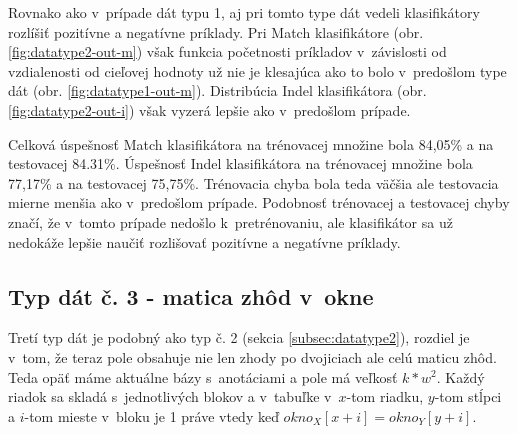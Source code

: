 Rovnako ako v~prípade dát typu 1, aj pri tomto type dát vedeli klasifikátory rozlíšiť pozitívne a negatívne príklady.
Pri Match klasifikátore (obr. \ref{fig:datatype2-out-m}) však funkcia početnosti príkladov v~závislosti od vzdialenosti od cieľovej hodnoty už nie je klesajúca ako to bolo v~predošlom type dát (obr. \ref{fig:datatype1-out-m}).
Distribúcia Indel klasifikátora (obr. \ref{fig:datatype2-out-i}) však vyzerá lepšie ako v~predošlom prípade.

Celková úspešnosť Match klasifikátora na trénovacej množine bola 84,05\% a na testovacej 84.31\%.
Úspešnosť Indel klasifikátora na trénovacej množine bola 77,17\% a na testovacej 75,75\%.
Trénovacia chyba bola teda väčšia ale testovacia mierne menšia ako v~predošlom prípade.
Podobnosť trénovacej a testovacej chyby značí, že v~tomto prípade nedošlo k~pretrénovaniu, ale klasifikátor sa už nedokáže lepšie naučiť rozlišovať pozitívne a negatívne príklady.

\subsection{Typ dát č. 3 - matica zhôd v~okne}

Tretí typ dát je podobný ako typ č. 2 (sekcia \ref{subsec:datatype2}), rozdiel je v~tom, že teraz pole obsahuje nie len zhody po dvojiciach ale celú maticu zhôd. Teda opäť máme aktuálne bázy s~anotáciami a pole má veľkosť $k*w^2$. Každý riadok sa skladá s~jednotlivých blokov a v~tabuľke v~$x$-tom riadku, $y$-tom stĺpci a $i$-tom mieste v~bloku je 1 práve
vtedy keď $okno_X[x+i] = okno_Y[y+i]$.

